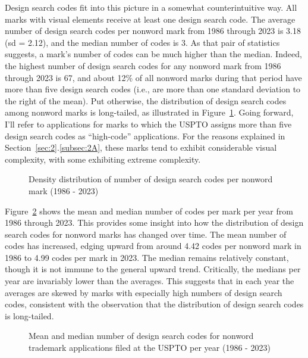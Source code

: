 \documentclass[letterpaper, 11pt, oneside]{article}
\begin{document}
Design search codes fit into this picture in a somewhat counterintuitive way. All marks with visual elements receive at least one design search code. The average number of design search codes per nonword mark from 1986 through 2023 is 3.18 (sd = 2.12), and the median number of codes is 3. As that pair of statistics suggests, a mark's number of codes can be much higher than the median. Indeed, the highest number of design search codes for any nonword mark from 1986 through 2023 is 67, and about 12\% of all nonword marks during that period have more than five design search codes (i.e., are more than one standard deviation to the right of the mean). Put otherwise, the distribution of design search codes among nonword marks is long-tailed, as illustrated in Figure~\ref{fig:4}. Going forward, I'll refer to applications for marks to which the USPTO assigns more than five design search codes as ``high-code'' applications. For the reasons explained in Section~\ref{sec:2}.\ref{subsec:2A}, these marks tend to exhibit considerable visual complexity, with some exhibiting extreme complexity.

\begin{figure}[H]
\centering

\caption{\label{fig:4} Density distribution of number of design search codes per nonword mark (1986 - 2023)}
\end{figure}

Figure~\ref{fig:5} shows the mean and median number of codes per mark per year from 1986 through 2023. This provides some insight into how the distribution of design search codes for nonword marks has changed over time. The mean number of codes has increased, edging upward from around 4.42 codes per nonword mark in 1986 to 4.99 codes per mark in 2023. The median remains relatively constant, though it is not immune to the general upward trend. Critically, the medians per year are invariably lower than the averages. This suggests that in each year the averages are skewed by marks with especially high numbers of design search codes, consistent with the observation that the distribution of design search codes is long-tailed.

\begin{figure}[H]
\centering

\caption{\label{fig:5} Mean and median number of design search codes for nonword trademark applications filed at the USPTO per year (1986 - 2023)}
\end{figure}
\end{document}
